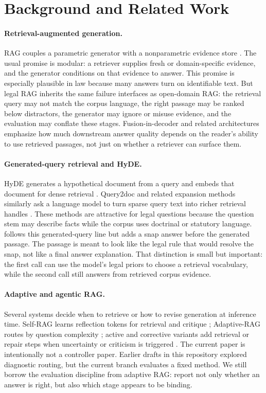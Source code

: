 \section{Background and Related Work}\label{sec:preliminary}

\paragraph{Retrieval-augmented generation.}
RAG couples a parametric generator with a nonparametric evidence store
\citep{lewis2020rag}. The usual promise is modular: a retriever supplies
fresh or domain-specific evidence, and the generator conditions on that
evidence to answer. This promise is especially plausible in law because many
answers turn on identifiable text. But legal RAG inherits the same failure
interfaces as open-domain RAG: the retrieval query may not match the corpus
language, the right passage may be ranked below distractors, the generator may
ignore or misuse evidence, and the evaluation may conflate these stages.
Fusion-in-decoder and related architectures \citep{izacard2021fid} emphasize
how much downstream answer quality depends on the reader's ability to use
retrieved passages, not just on whether a retriever can surface them.

\paragraph{Generated-query retrieval and HyDE.}
HyDE generates a hypothetical document from a query and embeds that document
for dense retrieval \citep{gao2023hyde}. Query2doc and related expansion
methods similarly ask a language model to turn sparse query text into richer
retrieval handles \citep{wang2023query2doc}. These methods are attractive for
legal questions because the question stem may describe facts while the corpus
uses doctrinal or statutory language. \hyre{} follows this generated-query
line but adds a snap answer before the generated passage. The passage is meant
to look like the legal rule that would resolve the snap, not like a final
answer explanation. That distinction is small but important: the first call
can use the model's legal priors to choose a retrieval vocabulary, while the
second call still answers from retrieved corpus evidence.

\paragraph{Adaptive and agentic RAG.}
Several systems decide when to retrieve or how to revise generation at
inference time. Self-RAG learns reflection tokens for retrieval and critique
\citep{asai2024selfrag}; Adaptive-RAG routes by question complexity
\citep{jeong2024adaptive}; active and corrective variants add retrieval or
repair steps when uncertainty or criticism is triggered
\citep{jiang2023flare,yan2024crag}. The current paper is intentionally not a
controller paper. Earlier drafts in this repository explored diagnostic
routing, but the current branch evaluates a fixed method. We still borrow the
evaluation discipline from adaptive RAG: report not only whether an answer is
right, but also which stage appears to be binding.

